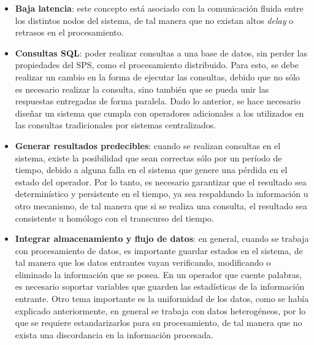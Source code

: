 \begin{itemize}
	\item \textbf{Baja latencia}: este concepto est\'a asociado con la comunicaci\'on fluida entre los distintos nodos del sistema, de tal manera que no existan altos \textit{delay} o retrasos en el procesamiento.
	\item \textbf{Consultas SQL}: poder realizar consultas a una base de datos, sin perder las propiedades del SPS, como el procesamiento distribuido. Para esto, se debe realizar un cambio en la forma de ejecutar las consultas, debido que no s\'olo es necesario realizar la consulta, sino tambi\'en que se pueda unir las respuestas entregadas de forma paralela. Dado lo anterior, se hace necesario dise\~nar un sistema que cumpla con operadores adicionales a los utilizados en las consultas tradicionales por sistemas centralizados.
	\item \textbf{Generar resultados predecibles}: cuando se realizan consultas en el sistema, existe la posibilidad que sean correctas s\'olo por un per\'iodo de tiempo, debido a alguna falla en el sistema que genere una p\'erdida en el estado del operador. Por lo tanto, es necesario garantizar que el resultado sea determin\'istico y persistente en el tiempo, ya sea respaldando la informaci\'on u otro mecanismo, de tal manera que si se realiza una consulta, el resultado sea consistente u hom\'ologo con el transcurso del tiempo.
	\item \textbf{Integrar almacenamiento y flujo de datos}: en general, cuando se trabaja con procesamiento de datos, es importante guardar estados en el sistema, de tal manera que los datos entrantes vayan verificando, modificando o eliminado la informaci\'on que se posea. En un operador que cuente palabras, es necesario soportar variables que guarden las estad\'isticas de la informaci\'on entrante. Otro tema importante es la uniformidad de los datos, como se hab\'ia explicado anteriormente, en general se trabaja con datos heterog\'eneos, por lo que se requiere estandarizarlos para su procesamiento, de tal manera que no exista una discordancia en la informaci\'on procesada.

\end{itemize}
